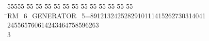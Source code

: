 %
%
\begin{tabbing}
55555 \= 55 \= 55 \= 55 \= 55 \= 55 \= 55 \= 55 \= 55 \= 55 \= 55 \= 55 \= 55 \= \>RM\_6\_GENERATOR\_5=8912132425282910111415262730314041\\[0pt]
245565760614243464758596263\\[0pt]
3\>\end{tabbing}
